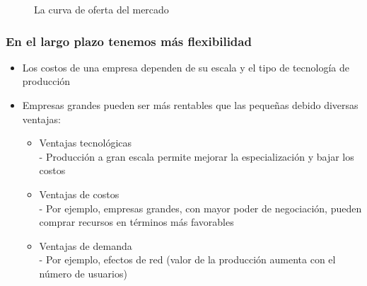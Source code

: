 \documentclass{beamer}
\begin{document}
\begin{frame}
\begin{center}
\begin{figure}[H]
\begin{center}
\end{center}
\caption{La curva de oferta del mercado}
\label{fig:C13.7}
\end{figure}
\end{center}
\end{frame}

\begin{frame}
\frametitle{En el largo plazo tenemos más flexibilidad}
\begin{itemize}
    \item Los costos de una empresa dependen de su escala y el tipo de tecnología de producción
    \item Empresas grandes pueden ser más rentables que las pequeñas debido diversas ventajas:
    \begin{itemize}
        \item Ventajas tecnológicas \\
        - Producción a gran escala permite mejorar la especialización y bajar los costos
        \item Ventajas de costos \\
        - Por ejemplo, empresas grandes, con mayor poder de negociación, pueden comprar recursos en términos más favorables
        \item Ventajas de demanda \\
        - Por ejemplo, efectos de red (valor de la producción aumenta con el número de usuarios)
    \end{itemize}
\end{itemize}
\end{frame}
\end{document}
